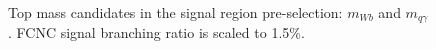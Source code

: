 \begin{figure}[h!]
\caption{Top mass candidates in the signal region pre-selection: $m_{W b}$ and $m_{q\gamma}$. FCNC signal branching ratio is scaled to 1.5\%.}
\label{fig:PreSelTopMasses}
\end{figure}




